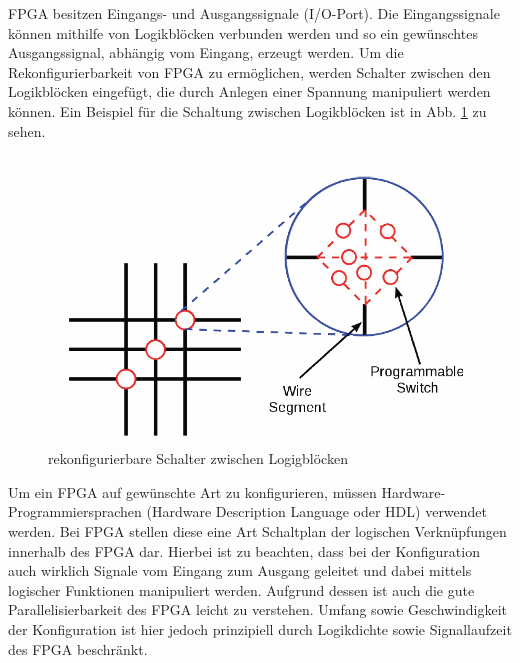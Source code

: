 FPGA besitzen Eingangs- und Ausgangssignale (I/O-Port).
Die Eingangssignale können mithilfe von Logikblöcken verbunden werden und so ein gewünschtes Ausgangssignal, abhängig vom Eingang, erzeugt werden.
Um die Rekonfigurierbarkeit von FPGA zu ermöglichen, werden \glqq Schalter\grqq{} zwischen den Logikblöcken eingefügt, die durch Anlegen einer Spannung manipuliert werden können.
Ein Beispiel für die Schaltung zwischen Logikblöcken ist in Abb. \ref{schalter} zu sehen.
\begin{figure}[h]
  \includegraphics[width=\linewidth]{../Daten/schalter.png}
  \caption{rekonfigurierbare Schalter zwischen Logigblöcken \cite{Anleitung}}
  \label{schalter}
\end{figure}
Um ein FPGA auf gewünschte Art zu konfigurieren, müssen Hardware-Programmiersprachen (\glqq Hardware Description Language\grqq{} oder HDL) verwendet werden.
Bei FPGA stellen diese eine Art \glqq Schaltplan\grqq{} der logischen Verknüpfungen innerhalb des FPGA dar.
Hierbei ist zu beachten, dass bei der Konfiguration auch wirklich Signale vom Eingang zum Ausgang geleitet und dabei mittels logischer Funktionen manipuliert werden.
Aufgrund dessen ist auch die gute Parallelisierbarkeit des FPGA leicht zu verstehen.
Umfang sowie Geschwindigkeit der Konfiguration ist hier jedoch prinzipiell durch Logikdichte sowie Signallaufzeit des FPGA beschränkt.

